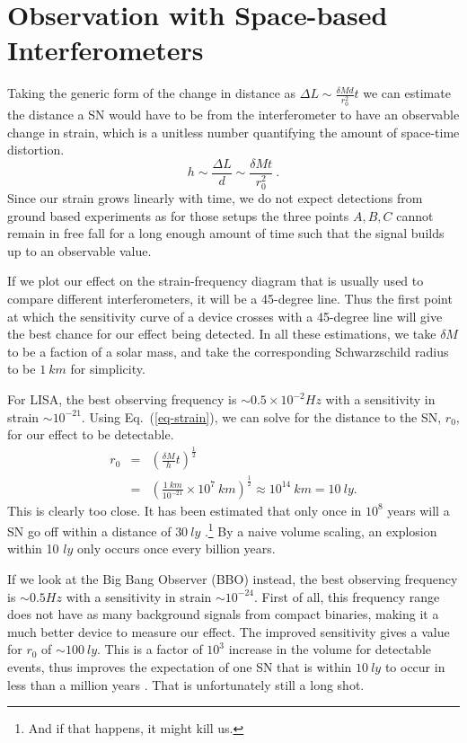 \documentclass[aps,showpacs,onecolumn,floats,prd,superscriptaddress,nofootinbib]{revtex4-1}
\begin{document}
\section{Observation with Space-based Interferometers}
\label{obs}
Taking the generic form of the change in distance as $\Delta L \sim \frac{\delta M d}{r_0^2} t$ we can estimate the distance a SN would have to be from the interferometer to have an observable change in strain, which is a unitless number quantifying the amount of space-time distortion.
\begin{equation}
h \sim \frac{\Delta L}{d} \sim \frac{\delta M t}{r_0^2}~.
\label{eq-strain}
\end{equation} 
Since our strain grows linearly with time, we do not expect detections from ground based experiments as for those setups the three points $A,B,C$ cannot remain in free fall for a long enough amount of time such that the signal builds up to an observable value. 

If we plot our effect on the strain-frequency diagram \cite{GWcurves} that is usually used to compare different interferometers, it will be a 45-degree line. Thus the first point at which the sensitivity curve of a device crosses with a 45-degree line will give the best chance for our effect being detected. In all these estimations, we take $\delta M$ to be a faction of a solar mass, and take the corresponding Schwarzschild radius to be $1~km$ for simplicity.

For LISA, the best observing frequency is $\sim 0.5 \times10^{-2} Hz$ with a sensitivity in strain $\sim 10^{-21}$. Using Eq.~(\ref{eq-strain}), we can solve for the distance to the SN, $r_0$, for our effect to be detectable.
\begin{eqnarray}
	r_0 & = &  \left(  \frac{\delta M}{h} t \right)^\frac{1}{2} \label{Meas}	\\
	& = &  \left( \frac{1 \ km}{10^{-21}} \times 10^7 \ km \right)^\frac{1}{2} \approx 10^{14} \ km = 10 \ ly.
\end{eqnarray}
This is clearly too close. It has been estimated that only once in $10^8$ years will a SN go off within a distance of $30 \ ly$ \cite{EllSch93}.\footnote{And if that happens, it might kill us.} By a naive volume scaling, an explosion within 10 $ly$ only occurs once every billion years.

If we look at the Big Bang Observer (BBO) instead, the best observing frequency is $\sim 0.5 Hz$ with a sensitivity in strain $\sim 10^{-24}$. First of all, this frequency range does not have as many background signals from compact binaries, making it a much better device to measure our effect. The improved sensitivity gives a value for $r_0$ of $\sim 100 \ ly$. This is a factor of $10^3$ increase in the volume for detectable events, thus improves the expectation of one SN that is within $10 \ ly$ to occur in less than a million years . That is unfortunately still a long shot.
\end{document}
